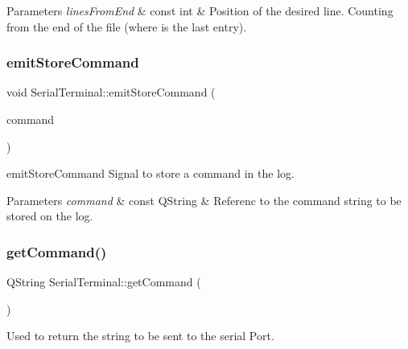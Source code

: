 \begin{DoxyParams}{Parameters}
{\em lines\+From\+End} & const int \& Position of the desired line. Counting from the end of the file (where is the last entry). \\
\hline
\end{DoxyParams}
\mbox{\label{classSerialTerminal_a8c8fbd2c39d1c6870560abf2808f040e}} 
\subsubsection{\texorpdfstring{emit\+Store\+Command}{emitStoreCommand}}
{\footnotesize\ttfamily void Serial\+Terminal\+::emit\+Store\+Command (\begin{DoxyParamCaption}\item[{const Q\+String \&}]{command }\end{DoxyParamCaption})\hspace{0.3cm}{\ttfamily [signal]}}



emit\+Store\+Command Signal to store a command in the log. 


\begin{DoxyParams}{Parameters}
{\em command} & const Q\+String \& Referenc to the command string to be stored on the log. \\
\hline
\end{DoxyParams}
\mbox{\label{classSerialTerminal_a1047c3c8d5502824822a4c95511b8526}} 
\subsubsection{\texorpdfstring{get\+Command()}{getCommand()}}
{\footnotesize\ttfamily Q\+String Serial\+Terminal\+::get\+Command (\begin{DoxyParamCaption}{ }\end{DoxyParamCaption})\hspace{0.3cm}{\ttfamily [inline]}}



Used to return the string to be sent to the serial Port. 

